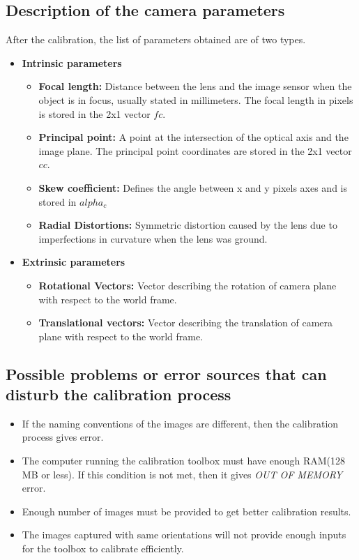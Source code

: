 \documentclass[11pt,a4paper]{article}
\begin{document}
				
				\subsection{Description of the camera parameters}
				After the calibration, the list of parameters obtained are of two types.
				\begin{itemize}
					\item \textbf{Intrinsic parameters}
					\begin{itemize}
						\item \textbf{Focal length:} Distance between the lens and the image sensor when the object is in focus, usually stated in millimeters. The focal length in pixels is stored in the 2x1 vector $fc$. 
						\item \textbf{Principal point:} A point at the intersection of the optical axis and the image plane. The principal point coordinates are stored in the 2x1 vector $cc$.
						\item \textbf{Skew coefficient:} Defines the angle between x and y pixels axes and is stored in $alpha_c$
						\item \textbf{Radial Distortions:} Symmetric distortion caused by the lens due to imperfections in curvature when the lens was ground.
					\end{itemize}
					\item \textbf{Extrinsic parameters}
					\begin{itemize}
						\item \textbf{Rotational Vectors:} Vector describing the rotation of camera plane with respect to the world frame.
						\item \textbf{Translational vectors:} Vector describing the translation of camera plane with respect to the world frame.
					\end{itemize}
				\end{itemize}
				
				\subsection{Possible problems or error sources that can disturb the calibration process}
				\begin{itemize}
					\item If the naming conventions of the images are different, then the calibration process gives error.
					\item The computer running the calibration toolbox must have enough RAM(128 MB or less). If this condition is not met, then it gives \textit{OUT OF MEMORY} error.
					\item Enough number of images must be provided to get better calibration results.
					\item The images captured with same orientations will not provide enough inputs for the toolbox to calibrate efficiently.
				\end{itemize}
				
\end{document}
